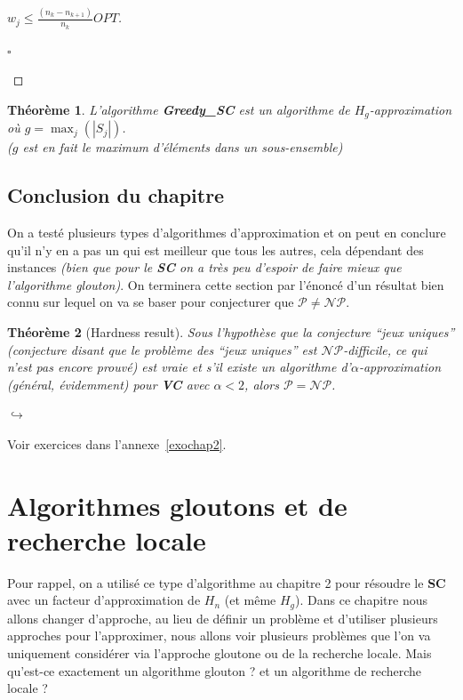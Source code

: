 \documentclass{article}
\newcommand{\titre}[1]{\textcolor{title}{#1}}
\newcommand{\cqfd}{\begin{flushright}$\square$\end{flushright}}
\newtheorem{thm}{Th\'eor\`eme}[section]
\newtheorem{proof}{Preuve}[section]
\begin{document}
\begin{sffamily}
\begin{proof}[$w_j \leq \frac{(n_k - n_{k+1})}{n_k}OPT$]
\cqfd
\end{proof}

\begin{thm} L'algorithme \textbf{Greedy\_SC} est un algorithme de $H_g$-approximation où $g = \max_{j}(|S_j|)$. \\($g$ est en fait le
maximum d'éléments dans un sous-ensemble)
\end{thm}

\subsection{Conclusion du chapitre}

On a testé plusieurs types d'algorithmes d'approximation et on peut en conclure qu'il n'y en a pas un qui est meilleur que tous les
autres, cela dépendant des instances \textit{(bien que pour le \titre{\textbf{SC}} on a très peu d'espoir de faire mieux que l'algorithme
glouton)}. On terminera cette section par l'énoncé d'un résultat bien connu sur lequel on va se baser pour conjecturer que $\mathcal{P}
\neq \mathcal{NP}$.

\begin{thm}[Hardness result] Sous l'hypothèse que la conjecture ``jeux uniques'' (conjecture disant que le problème des ``jeux uniques''
est $\mathcal{NP}$-difficile, ce qui n'est pas encore prouvé) est vraie et s'il existe un algorithme d'$\alpha$-approximation (général,
évidemment) pour \textbf{\titre{VC}} avec $\alpha < 2$, alors $\mathcal{P} = \mathcal{NP}$. \end{thm}

\vspace{22em}
\begin{flushright}
$\hookrightarrow$ \begin{large}Voir exercices dans l'annexe~\ref{exochap2}.\end{large}
\end{flushright}

\newpage

\section{Algorithmes gloutons et de recherche locale}

Pour rappel, on a utilisé ce type d'algorithme au chapitre 2 pour résoudre le \textbf{\titre{SC}} avec un facteur d'approximation de
$H_n$ (et même $H_g$). Dans ce chapitre nous allons changer d'approche, au lieu de définir un problème et d'utiliser plusieurs approches
pour l'approximer, nous allons voir plusieurs problèmes que l'on va uniquement considérer via l'approche gloutone ou de la recherche
locale. Mais qu'est-ce exactement un algorithme glouton ? et un algorithme de recherche locale ?


\end{sffamily}
\end{document}
